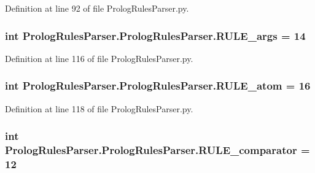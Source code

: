 Definition at line 92 of file Prolog\+Rules\+Parser.\+py.

\hypertarget{class_prolog_rules_parser_1_1_prolog_rules_parser_a5280a17312cf9ff3026589fbe178c8c8}{}
\subsubsection[{R\+U\+L\+E\+\_\+args}]{\setlength{\rightskip}{0pt plus 5cm}int Prolog\+Rules\+Parser.\+Prolog\+Rules\+Parser.\+R\+U\+L\+E\+\_\+args = 14\hspace{0.3cm}{\ttfamily [static]}}\label{class_prolog_rules_parser_1_1_prolog_rules_parser_a5280a17312cf9ff3026589fbe178c8c8}


Definition at line 116 of file Prolog\+Rules\+Parser.\+py.

\hypertarget{class_prolog_rules_parser_1_1_prolog_rules_parser_a691f884125527c3a3c0c0546d0b9026f}{}
\subsubsection[{R\+U\+L\+E\+\_\+atom}]{\setlength{\rightskip}{0pt plus 5cm}int Prolog\+Rules\+Parser.\+Prolog\+Rules\+Parser.\+R\+U\+L\+E\+\_\+atom = 16\hspace{0.3cm}{\ttfamily [static]}}\label{class_prolog_rules_parser_1_1_prolog_rules_parser_a691f884125527c3a3c0c0546d0b9026f}


Definition at line 118 of file Prolog\+Rules\+Parser.\+py.

\hypertarget{class_prolog_rules_parser_1_1_prolog_rules_parser_ac54d4c950a548415336043b3dd865d7d}{}
\subsubsection[{R\+U\+L\+E\+\_\+comparator}]{\setlength{\rightskip}{0pt plus 5cm}int Prolog\+Rules\+Parser.\+Prolog\+Rules\+Parser.\+R\+U\+L\+E\+\_\+comparator = 12\hspace{0.3cm}{\ttfamily [static]}}\label{class_prolog_rules_parser_1_1_prolog_rules_parser_ac54d4c950a548415336043b3dd865d7d}


